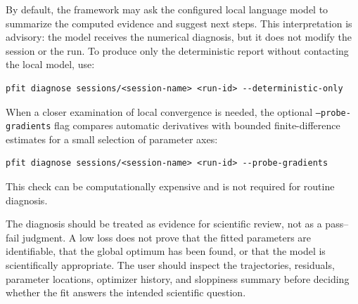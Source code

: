 By default, the framework may ask the configured local language model to
summarize the computed evidence and suggest next steps. This interpretation is
advisory: the model receives the numerical diagnosis, but it does not modify the
session or the run. To produce only the deterministic report without contacting
the local model, use:

\begin{verbatim}
pfit diagnose sessions/<session-name> <run-id> --deterministic-only
\end{verbatim}

When a closer examination of local convergence is needed, the optional
\texttt{--probe-gradients} flag compares automatic derivatives with bounded
finite-difference estimates for a small selection of parameter axes:

\begin{verbatim}
pfit diagnose sessions/<session-name> <run-id> --probe-gradients
\end{verbatim}

This check can be computationally expensive and is not required for routine
diagnosis.

The diagnosis should be treated as evidence for scientific review, not as a
pass--fail judgment. A low loss does not prove that the fitted parameters are
identifiable, that the global optimum has been found, or that the model is
scientifically appropriate. The user should inspect the trajectories, residuals,
parameter locations, optimizer history, and sloppiness summary before deciding
whether the fit answers the intended scientific question.
